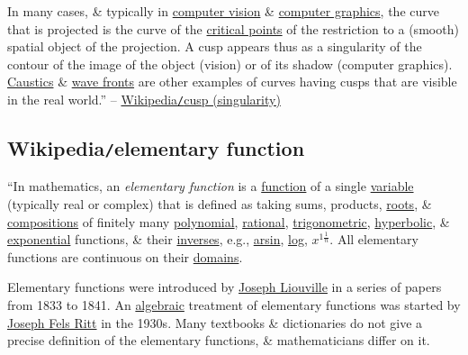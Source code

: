\documentclass{article}
\begin{document}
In many cases, \& typically in \href{https://en.wikipedia.org/wiki/Computer_vision}{computer vision} \& \href{https://en.wikipedia.org/wiki/Computer_graphics}{computer graphics}, the curve that is projected is the curve of the \href{https://en.wikipedia.org/wiki/Critical_point_(mathematics)}{critical points} of the restriction to a (smooth) spatial object of the projection. A cusp appears thus as a singularity of the contour of the image of the object (vision) or of its shadow (computer graphics). \href{https://en.wikipedia.org/wiki/Caustic_(mathematics)}{Caustics} \& \href{https://en.wikipedia.org/wiki/Wave_front}{wave fronts} are other examples of curves having cusps that are visible in the real world.'' -- \href{https://en.wikipedia.org/wiki/Cusp_(singularity)}{Wikipedia{\tt/}cusp (singularity)}


\subsection{Wikipedia{\tt/}elementary function}
``In mathematics, an {\it elementary function} is a \href{https://en.wikipedia.org/wiki/Function_(mathematics)}{function} of a single \href{https://en.wikipedia.org/wiki/Variable_(mathematics)}{variable} (typically real or complex) that is defined as taking sums, products, \href{https://en.wikipedia.org/wiki/Algebraic_function}{roots}, \& \href{https://en.wikipedia.org/wiki/Composition_of_functions}{compositions} of finitely many \href{https://en.wikipedia.org/wiki/Polynomial#Polynomial_functions}{polynomial}, \href{https://en.wikipedia.org/wiki/Rational_function}{rational}, \href{https://en.wikipedia.org/wiki/Trigonometric_functions}{trigonometric}, \href{https://en.wikipedia.org/wiki/Hyperbolic_functions}{hyperbolic}, \& \href{https://en.wikipedia.org/wiki/Exponential_function}{exponential} functions, \& their \href{https://en.wikipedia.org/wiki/Inverse_function}{inverses}, e.g., \href{https://en.wikipedia.org/wiki/Inverse_trigonometric_functions}{arsin}, \href{https://en.wikipedia.org/wiki/Natural_logarithm}{log}, $x^{1\frac{1}{n}}$. All elementary functions are continuous on their \href{https://en.wikipedia.org/wiki/Domain_of_a_function}{domains}.

Elementary functions were introduced by \href{https://en.wikipedia.org/wiki/Joseph_Liouville}{\sc Joseph Liouville} in a series of papers from 1833 to 1841. An \href{https://en.wikipedia.org/wiki/Abstract_algebra}{algebraic} treatment of elementary functions was started by \href{https://en.wikipedia.org/wiki/Joseph_Fels_Ritt}{\sc Joseph Fels Ritt} in the 1930s. Many textbooks \& dictionaries do not give a precise definition of the elementary functions, \& mathematicians differ on it.
\end{document}
